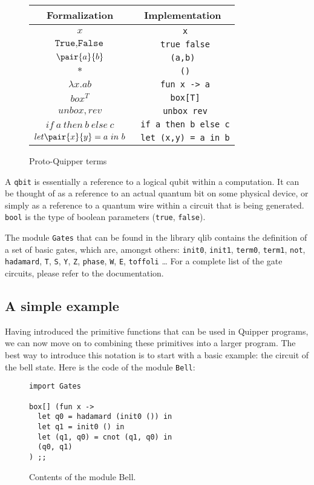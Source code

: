 \begin{figure}[!ht]
\begin{center}
\begin{tabular}{|c|c|}
	\hline
	Formalization & Implementation \\\hline
	$x$ & \verb# x# \\\hline
	$\texttt{True}, \texttt{False}$ & \verb# true false# \\\hline
	$\pair{a}{b}$ & \verb# (a,b) # \\\hline
	$*$ & \verb# ()# \\\hline
	$\lambda x.ab$ & \verb# fun x -> a# \\\hline
	$box^T$ & \verb# box[T]# \\\hline
	$unbox, rev$ & \verb# unbox rev# \\\hline
	$if ~a~ then ~b~ else ~c$ & \verb# if a then b else c# \\\hline
	$let \pair{x}{y} = a ~in~ b$ & \verb# let (x,y) = a in b# \\\hline
\end{tabular}
\end{center}
\label{terms}
\caption{Proto-Quipper terms}
\end{figure}

A \verb#qbit# is essentially a reference to a logical qubit within a
computation. It can be thought of as a reference to an actual quantum
bit on some physical device, or simply as a reference to a quantum
wire within a circuit that is being generated. \verb#bool# is the type of boolean parameters
(\verb#true#, \verb#false#).

The module \verb#Gates# that can be found in the library qlib contains the definition of a set of basic gates,
which are, amongst others: \verb#init0#, \verb#init1#, \verb#term0#, \verb#term1#, \verb#not#, \verb#hadamard#, \verb#T#,
\verb#S#, \verb#Y#, \verb#Z#, \verb#phase#, \verb#W#, \verb#E#, \verb#toffoli# \ldots
For a complete list of the gate circuits, please refer to the documentation.

\subsection{A simple example}\label{ssec-quipper-by-e}
Having introduced the primitive functions that can be used in Quipper
programs, we can now move on to combining these primitives into a
larger program. The best way to introduce this notation is to start with a basic example: the circuit of the
bell state. Here is the code of the module \verb#Bell#:
\begin{figure}[!ht]
\begin{verbatim}
import Gates

box[] (fun x ->
  let q0 = hadamard (init0 ()) in
  let q1 = init0 () in
  let (q1, q0) = cnot (q1, q0) in
  (q0, q1)
) ;;
\end{verbatim}
\caption{Contents of the module Bell.}
\end{figure}


